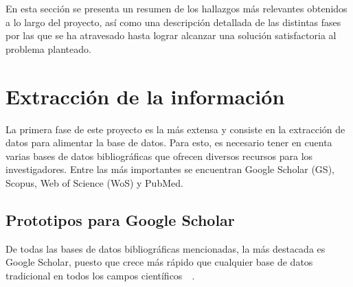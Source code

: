 

En esta sección se presenta un resumen de los hallazgos más relevantes obtenidos a lo largo del proyecto, así como una descripción detallada de las distintas fases por las que se ha atravesado hasta lograr alcanzar una solución satisfactoria al problema planteado.

\section{Extracción de la información}
La primera fase de este proyecto es la más extensa y consiste en la extracción de datos para alimentar la base de datos. Para esto, es necesario tener en cuenta varias bases de datos bibliográficas que ofrecen diversos recursos para los investigadores. Entre las más importantes se encuentran Google Scholar (GS), Scopus, Web of Science (WoS) y PubMed.

\subsection{Prototipos para Google Scholar}

De todas las bases de datos bibliográficas mencionadas, la más destacada es Google Scholar, puesto que crece más rápido que cualquier base de datos tradicional en todos los campos científicos~\cite{harzing2010}~\cite{lopez2017}.

